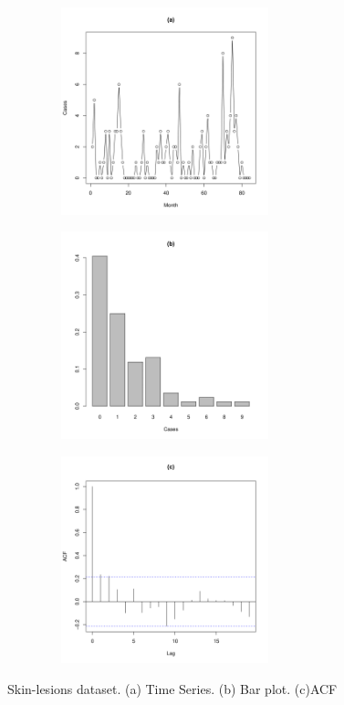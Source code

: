 \documentclass[11pt]{article}
\begin{document}
\begin{enumerate}
\begin{figure}[H]
    \centering
    \begin{subfigure}
    \centering
    \includegraphics[width=7cm, height=6cm]{Slesion-1.png}
    \end{subfigure}
    \begin{subfigure}
    \centering
    \includegraphics[width=7cm, height=6cm]{SlesionBarPlot-1.png}
    \end{subfigure}
    
    \begin{subfigure}
    \centering
    \includegraphics[width=7cm, height=6cm]{SlesionACF-1.png}
    \end{subfigure}
    
    \caption{Skin-lesions dataset. (a) Time Series. (b) Bar plot. (c)ACF}


    \label{fig:copulagraph}
\end{figure}

\end{enumerate}
\end{document}
